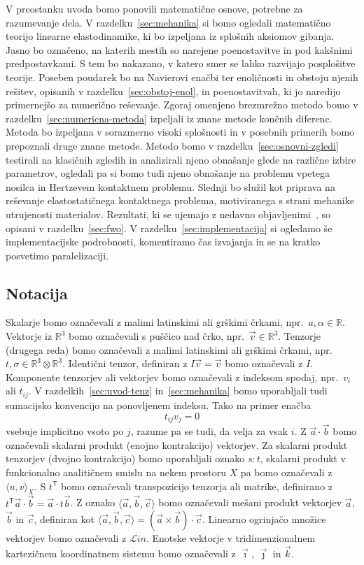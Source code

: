 \documentclass[12pt,a4paper,twoside]{article}
\theoremstyle{definition} %
\theoremstyle{plain} %
\numberwithin{equation}{section}
\newcommand{\R}{\mathbb R}
\newcommand{\T}{\mathsf{T}}
\newcommand{\Lin}{\mathcal{L}in}
\newcommand{\vv}{\vec{v}}
\newcommand{\va}{\vec{a}}
\newcommand{\vc}{\vec{c}}
\newcommand{\vb}{\vec{b}}
\newcommand{\vi}{\vec{\imath}}
\newcommand{\vj}{\vec{\jmath}}
\newcommand{\vk}{\vec{k}}
\begin{document}
V preostanku uvoda bomo ponovili matematične osnove, potrebne za razumevanje dela.  V
razdelku~\ref{sec:mehanika} si bomo ogledali matematično teorijo linearne elastodinamike, ki bo
izpeljana iz splošnih aksiomov gibanja. Jasno bo označeno, na katerih mestih so narejene
poenostavitve in pod kakšnimi predpostavkami. S tem bo nakazano, v katero smer se lahko razvijajo
posplošitve teorije. Poseben poudarek bo na Navierovi enačbi ter enoličnosti in obstoju njenih
rešitev, opisanih v razdelku~\ref{sec:obstoj-enol}, in poenostavitvah, ki jo naredijo primernejšo za
numerično reševanje. Zgoraj omenjeno brezmrežno metodo bomo v razdelku~\ref{sec:numericna-metoda}
izpeljali iz znane metode končnih diferenc. Metoda bo izpeljana v sorazmerno visoki splošnosti in v
posebnih primerih bomo prepoznali druge znane metode.  Metodo bomo v
razdelku~\ref{sec:osnovni-zgledi} testirali na klasičnih zgledih in analizirali njeno obnašanje
glede na različne izbire parametrov, ogledali pa si bomo tudi njeno obnašanje na problemu vpetega
nosilca in Hertzevem kontaktnem problemu. Slednji bo služil kot priprava na reševanje
elastostatičnega kontaktnega problema, motiviranega s strani mehanike utrujenosti materialov.
Rezultati, ki se ujemajo z nedavno objavljenimi~\cite{pereira2016convergence}, so opisani v
razdelku~\ref{sec:fwo}. V razdelku~\ref{sec:implementacija} si ogledamo še implementacijske
podrobnosti, komentiramo čas izvajanja in se na kratko posvetimo paralelizaciji.

\subsection{Notacija}
Skalarje bomo označevali z malimi latinskimi ali grškimi črkami, npr.~$a, \alpha
\in \R$. Vektorje iz $\R^3$ bomo označevali s puščico nad črko, npr.~$\vv \in
\R^3$. Tenzorje (drugega reda) bomo označevali z malimi latinskimi ali grškimi
črkami, npr.~$t, \sigma \in \R^3\otimes\R^3$. Identični tenzor, definiran z $I\vv = \vv$ bomo
označevali z $I$. Komponente tenzorjev ali vektorjev bomo označevali z indeksom spodaj, npr.~$v_i$
ali $t_{ij}$. V razdelkih~\ref{sec:uvod-tenz} in~\ref{sec:mehanika} bomo uporabljali tudi
sumacijsko konvencijo na ponovljenem indeksu. Tako na primer enačba
\[
  t_{ij}v_j = 0
\]
vsebuje implicitno vsoto po $j$, razume pa se tudi, da velja za vsak $i$. Z $\va\cdot\vb$ bomo
označevali skalarni produkt (enojno kontrakcijo) vektorjev. Za skalarni produkt tenzorjev (dvojno
kontrakcijo) bomo uporabljali oznako $s:t$, skalarni produkt v funkcionalno analitičnem smislu na
nekem prostoru $X$ pa bomo označevali z $\langle u, v\rangle_X$. S $t^\T$ bomo označevali
transpozicijo tenzorja ali matrike, definirano z $t^\T\va \cdot \vb = \va\cdot t\vb$. Z oznako
$\langle \va, \vb, \vc\rangle$ bomo označevali mešani produkt vektorjev $\va$, $\vb$ in $\vc$,
definiran kot $\langle \va, \vb, \vc\rangle = (\va\times\vb)\cdot \vc$.
Linearno ogrinjačo množice vektorjev bomo označevali z $\Lin$. Enotske vektorje v tridimenzionalnem
kartezičnem koordinatnem sistemu bomo označevali z $\vi$, $\vj$ in $\vk$.
\end{document}
